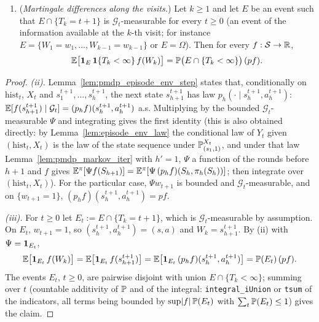 \begin{lemma}
\begin{enumerate}
        $(\mathcal G_t)_t$, with $w_{t+1}$ predictable.
  \item[(iii)] (\emph{Martingale differences along the visits.}) Let $k \ge 1$ and let $E$ be an
        event such that $E \cap \{T_k = t + 1\}$ is $\mathcal G_t$-measurable for every $t \ge 0$
        (an event of the information available at the $k$-th visit; for instance
        $E = \{W_1 = w_1, \dots, W_{k-1} = w_{k-1}\}$ or $E = \Omega$). Then for every $f : \mathcal{S} \to \mathbb{R}$,
        \[
          \mathbb{E}\big[\mathbf{1}_{E}\,\mathbf{1}\{T_k < \infty\}\, f(W_k)\big]
          = \mathbb{P}\big(E \cap \{T_k < \infty\}\big)\,(pf) .
        \]
\end{enumerate}
\end{lemma}

\begin{proof}
\leanok
\emph{(ii).} Lemma~\ref{lem:pmdp_episode_env_step} states that, conditionally on
$\mathrm{hist}_t$, $X_t$ and $s^{t+1}_1, \dots, s^{t+1}_h$, the next state $s^{t+1}_{h+1}$ has law
$p_h(\cdot \mid s^{t+1}_h, a^{t+1}_h)$: $\mathbb{E}[f(s^{t+1}_{h+1}) \mid \mathcal G_t] = (p_h f)(s^{t+1}_h, a^{t+1}_h)$
a.s. Multiplying by the bounded $\mathcal G_t$-measurable $\Psi$ and integrating gives the
first identity (this is also obtained directly: by Lemma~\ref{lem:episode_env_law} the
conditional law of $Y_t$ given $(\mathrm{hist}_t, X_t)$ is the law of the state sequence under
$\mathbb{P}^{X_t}_{(s_1,1)}$, and under that law Lemma~\ref{lem:pmdp_markov_iter} with $h' = 1$,
$\Psi$ a function of the rounds before $h + 1$ and $f$ gives
$\mathbb{E}^{\pi}[\Psi f(S_{h+1})] = \mathbb{E}^\pi[\Psi\,(p_h f)(S_h, \pi_h(S_h))]$; then integrate over
$(\mathrm{hist}_t, X_t)$). For the particular case, $\Psi w_{t+1}$ is bounded and
$\mathcal G_t$-measurable, and on $\{w_{t+1} = 1\}$, $(p_h f)(s^{t+1}_h, a^{t+1}_h) = pf$.

\emph{(iii).} For $t \ge 0$ let $E_t := E \cap \{T_k = t + 1\}$, which is $\mathcal G_t$-measurable
by assumption. On $E_t$, $w_{t+1} = 1$, so $(s^{t+1}_h, a^{t+1}_h) = (s, a)$ and
$W_k = s^{t+1}_{h+1}$. By (ii) with $\Psi = \mathbf{1}_{E_t}$,
\[
  \mathbb{E}\big[\mathbf{1}_{E_t}\, f(W_k)\big] = \mathbb{E}\big[\mathbf{1}_{E_t}\, f(s^{t+1}_{h+1})\big]
  = \mathbb{E}\big[\mathbf{1}_{E_t}\,(p_h f)(s^{t+1}_h, a^{t+1}_h)\big] = \mathbb{P}(E_t)\,(pf) .
\]
The events $E_t$, $t \ge 0$, are pairwise disjoint with union $E \cap \{T_k < \infty\}$; summing
over $t$ (countable additivity of $\mathbb{P}$ and of the integral: \texttt{integral\_iUnion} or
\texttt{tsum} of the indicators, all terms being bounded by $\sup\lvert f \rvert\,\mathbb{P}(E_t)$ with
$\sum_t\mathbb{P}(E_t) \le 1$) gives the claim.


\end{proof}
